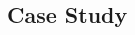 \documentclass{article}
\begin{document}
\begin{CJK}{UTF8}{gbsn}
\begin{multicols}{2}
            

        \section{Case Study}

\end{multicols}
\end{CJK}
\end{document}
